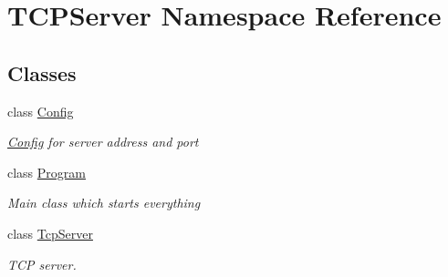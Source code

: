 \hypertarget{namespaceTCPServer}{}\section{T\+C\+P\+Server Namespace Reference}
\label{namespaceTCPServer}
\subsection*{Classes}
\begin{DoxyCompactItemize}
\item 
class \hyperlink{classTCPServer_1_1Config}{Config}
\begin{DoxyCompactList}\small\item\em \hyperlink{classTCPServer_1_1Config}{Config} for server address and port \end{DoxyCompactList}\item 
class \hyperlink{classTCPServer_1_1Program}{Program}
\begin{DoxyCompactList}\small\item\em Main class which starts everything \end{DoxyCompactList}\item 
class \hyperlink{classTCPServer_1_1TcpServer}{Tcp\+Server}
\begin{DoxyCompactList}\small\item\em T\+C\+P server. \end{DoxyCompactList}\end{DoxyCompactItemize}
